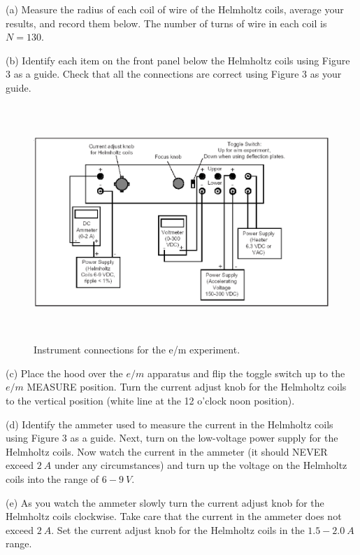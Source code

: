 (a) Measure the radius of each coil of wire of the Helmholtz coils, 
average your results, and record them
below.
The number of turns of wire in each coil is $N=130$.
\vspace{15mm}


(b) Identify each item on the front panel below
the Helmholtz coils using Figure 3 as a guide.
Check that all the connections are correct using Figure 3 as your guide. 
\begin{figure}[hbt]
\begin{center}

\includegraphics[height=3.5in]{eoverm2/apparatus2.ps}

\caption{Instrument connections for the e/m experiment.}

\end{center}
\end{figure}

(c) Place the hood over the $e/m$ apparatus and flip the 
toggle switch up to the $e/m$ MEASURE
position.
Turn the current adjust knob for the Helmholtz coils to the vertical position (white line
at the 12 o'clock noon position).

(d) Identify the ammeter used to measure the current in the Helmholtz
coils using Figure 3 as a guide. 
Next, turn on the low-voltage power supply for the Helmholtz coils.
Now watch the current in the ammeter (it should NEVER exceed $2~A$ under
any circumstances) and
turn up the voltage on the Helmholtz coils into the range of $6-9~V$.

(e) As you watch the ammeter slowly turn the current adjust knob for the Helmholtz
coils clockwise. Take care that
the current in the ammeter does not exceed $2 ~A$.
Set the current adjust knob for the Helmholtz coils in the $1.5-2.0~A$ range.

